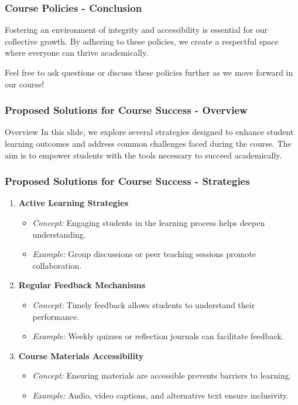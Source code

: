 \documentclass[aspectratio=169]{beamer}
\begin{document}
\begin{frame}[fragile]
  \frametitle{Course Policies - Conclusion}
  Fostering an environment of integrity and accessibility is essential for our collective growth. By adhering to these policies, we create a respectful space where everyone can thrive academically. 

  Feel free to ask questions or discuss these policies further as we move forward in our course!
\end{frame}

\begin{frame}[fragile]
    \frametitle{Proposed Solutions for Course Success - Overview}
    \begin{block}{Overview}
        In this slide, we explore several strategies designed to enhance student learning outcomes 
        and address common challenges faced during the course. The aim is to empower students with the tools 
        necessary to succeed academically.
    \end{block}
\end{frame}

\begin{frame}[fragile]
    \frametitle{Proposed Solutions for Course Success - Strategies}
    \begin{enumerate}
        \item \textbf{Active Learning Strategies}
            \begin{itemize}
                \item \textit{Concept:} Engaging students in the learning process helps deepen understanding.
                \item \textit{Example:} Group discussions or peer teaching sessions promote collaboration.
            \end{itemize}
        
        \item \textbf{Regular Feedback Mechanisms}
            \begin{itemize}
                \item \textit{Concept:} Timely feedback allows students to understand their performance.
                \item \textit{Example:} Weekly quizzes or reflection journals can facilitate feedback.
            \end{itemize}
            
        \item \textbf{Course Materials Accessibility}
            \begin{itemize}
                \item \textit{Concept:} Ensuring materials are accessible prevents barriers to learning.
                \item \textit{Example:} Audio, video captions, and alternative text ensure inclusivity.
            \end{itemize}
    \end{enumerate}
\end{frame}
\end{document}
